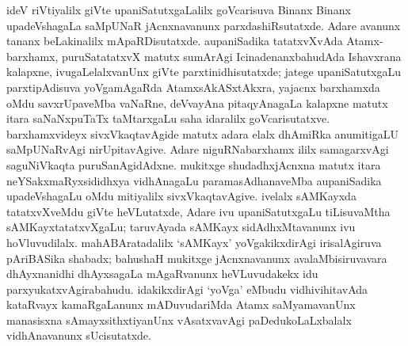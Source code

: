 ideV riVtiyalilx giVte upaniSatutxgaLalilx goVcarisuva Binanx Binanx upadeVsha\-gaLa saMpUNaR jAcnxnavanunx parxdashiRsutatxde. Adare avanunx tananx beLakinalilx mApaRDisutatxde. aupaniSadika tatatxvXvAda Atamx-barxhamx, puruSatatatxvX matutx sumArAgi IcinadenanxbahudAda Ishavxrana kalapxne, ivugaLelalxvanUnx giVte parxtinidhisutatxde; jatege upaniSatutxgaLu parxtipAdisuva yoVgamAgaRda AtamxsAkASxtAkxra, yajacnx barxhamxda oMdu savxrUpaveMba vaNaRne, deVvayAna pitaqyAnagaLa kalapxne matutx itara saNaNxpuTaTx taMtarxgaLu saha idaralilx goVcarisutatxve. barxhamxvideyx sivxVkaqtavAgide matutx adara elalx dhAmiRka anumitigaLU saMpUNaRvAgi nirUpitavAgive. Adare niguRNabarxhamx ililx samagarxvAgi saguNiVkaqta puruSanAgidAdxne. mukitxge shudadhxjAcnxna matutx itara neYSakxmaRyxsididhxya vidhAnagaLu paramasAdhanaveMba aupaniSadika upadeVshagaLu oMdu mitiyalilx sivxVkaqtavAgive. ivelalx sAMKayxda tatatxvXveMdu giVte heVLutatxde, Adare ivu upaniSatutxgaLu tiLisuvaMtha sAMKayxtatatxvXgaLu; taruvAyada sAMKayx sidAdhxMtavanunx ivu hoVluvudilalx. mahABAratadalilx `sAMKayx' yoVgakikxdirAgi irisalAgiruva pAriBASika shabadx; bahushaH mukitxge jAcnxnavanunx avalaMbisiruvavara dhAyxnanidhi dhAyxsagaLa mAgaRvanunx heVLuvudakekx idu parxyukatxvAgirabahudu. idakikxdirAgi `yoVga' eMbudu vidhivihitavAda kataRvayx kamaRgaLanunx mADuvudariMda Atamx saMyamavanUnx manasisxna sAmayxsithxtiyanUnx vAsatxvavAgi paDedukoLaLxbalalx vidhAnavanunx sUcisutatxde.

\newpage


